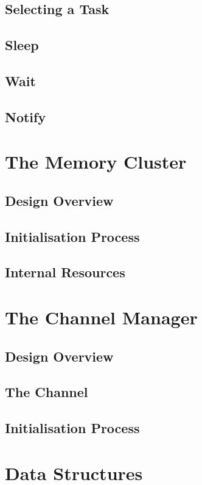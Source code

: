 \documentclass[12pt,a4paper]{article}
\begin{document}



\subsection{Selecting a Task}
\subsection{Sleep}
\subsection{Wait}
\subsection{Notify}

\section{The Memory Cluster}
\subsection{Design Overview}
\subsection{Initialisation Process}
\subsection{Internal Resources}

\section{The Channel Manager}
\subsection{Design Overview}
\subsection{The Channel}
\subsection{Initialisation Process}

\section{Data Structures}
\end{document}
